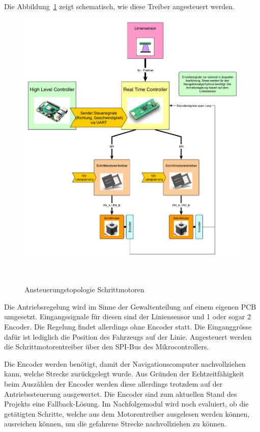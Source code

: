 \documentclass[main.tex]{subfiles} %
\begin{document}
Die Abbildung~\ref{Ansteuerungstopologie_Schrittmotorentreiber} zeigt
schematisch, wie diese Treiber angesteuert werden.

\begin{figure}[H]
    \centering
    \includegraphics[width = 1\linewidth]{fig_Antriebe_und_Dimensionierung/Konzept_RTC_Trinamic.pdf}
    \caption{Ansteuerungstopologie Schrittmotoren}~\label{Ansteuerungstopologie_Schrittmotorentreiber}
\end{figure}

Die Antriebsregelung wird im Sinne der Gewaltenteilung auf einem eigenen PCB
umgesetzt. Eingangssignale für diesen sind der Liniensensor und 1 oder sogar 2
Encoder. Die Regelung findet allerdings ohne Encoder statt. Die Einganggrösse
dafür ist lediglich die Position des Fahrzeugs auf der Linie. Angesteuert
werden die Schrittmotorentreiber über den SPI-Bus des Mikrocontrollers.

Die Encoder werden benötigt, damit der Navigationscomputer nachvollziehen kann,
welche Strecke zurückgelegt wurde. Aus Gründen der Echtzeitfähigkeit beim
Auszählen der Encoder werden diese allerdings trotzdem auf der
Antriebssteuerung ausgewertet. Die Encoder sind zum aktuellen Stand des
Projekts eine Fallback-Lösung. Im Nachfolgemodul wird noch evaluiert, ob die
getätigten Schritte, welche aus dem Motorentreiber ausgelesen werden können,
ausreichen können, um die gefahrene Strecke nachvollziehen zu können.
\end{document}
